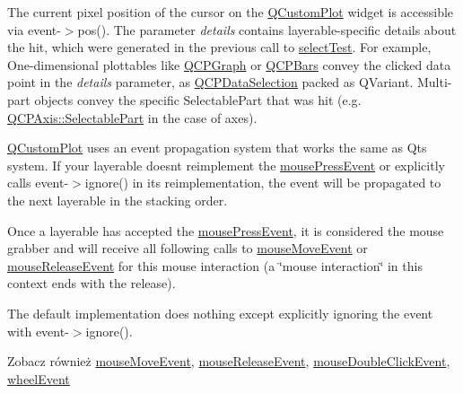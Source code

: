 The current pixel position of the cursor on the \hyperlink{class_q_custom_plot}{Q\+Custom\+Plot} widget is accessible via {\ttfamily event-\/$>$pos()}. The parameter {\itshape details} contains layerable-\/specific details about the hit, which were generated in the previous call to \hyperlink{class_q_c_p_layerable_a4001c4d0dfec55598efa4d531f2179a9}{select\+Test}. For example, One-\/dimensional plottables like \hyperlink{class_q_c_p_graph}{Q\+C\+P\+Graph} or \hyperlink{class_q_c_p_bars}{Q\+C\+P\+Bars} convey the clicked data point in the {\itshape details} parameter, as \hyperlink{class_q_c_p_data_selection}{Q\+C\+P\+Data\+Selection} packed as Q\+Variant. Multi-\/part objects convey the specific {\ttfamily Selectable\+Part} that was hit (e.\+g. \hyperlink{class_q_c_p_axis_abee4c7a54c468b1385dfce2c898b115f}{Q\+C\+P\+Axis\+::\+Selectable\+Part} in the case of axes).

\hyperlink{class_q_custom_plot}{Q\+Custom\+Plot} uses an event propagation system that works the same as Qt\textquotesingle{}s system. If your layerable doesn\textquotesingle{}t reimplement the \hyperlink{class_q_c_p_layerable_af6567604818db90f4fd52822f8bc8376}{mouse\+Press\+Event} or explicitly calls {\ttfamily event-\/$>$ignore()} in its reimplementation, the event will be propagated to the next layerable in the stacking order.

Once a layerable has accepted the \hyperlink{class_q_c_p_layerable_af6567604818db90f4fd52822f8bc8376}{mouse\+Press\+Event}, it is considered the mouse grabber and will receive all following calls to \hyperlink{class_q_c_p_layerable_a9eee1ba47fd69be111059ca3881933e4}{mouse\+Move\+Event} or \hyperlink{class_q_c_p_layerable_aa0d79b005686f668622bbe66ac03ba2c}{mouse\+Release\+Event} for this mouse interaction (a \char`\"{}mouse interaction\char`\"{} in this context ends with the release).

The default implementation does nothing except explicitly ignoring the event with {\ttfamily event-\/$>$ignore()}.

\begin{DoxySeeAlso}{Zobacz również}
\hyperlink{class_q_c_p_layerable_a9eee1ba47fd69be111059ca3881933e4}{mouse\+Move\+Event}, \hyperlink{class_q_c_p_layerable_aa0d79b005686f668622bbe66ac03ba2c}{mouse\+Release\+Event}, \hyperlink{class_q_c_p_layerable_a4171e2e823aca242dd0279f00ed2de81}{mouse\+Double\+Click\+Event}, \hyperlink{class_q_c_p_layerable_a47dfd7b8fd99c08ca54e09c362b6f022}{wheel\+Event} 
\end{DoxySeeAlso}


